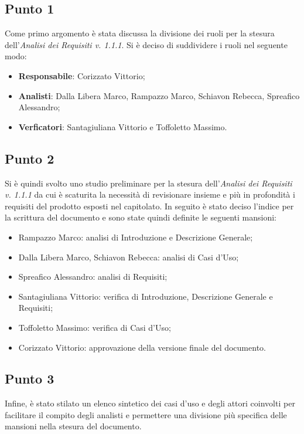     \subsection{Punto 1}
        Come primo argomento è stata discussa la divisione dei ruoli per la stesura dell'\textit{Analisi dei Requisiti v. 1.1.1}. Si è deciso di suddividere i ruoli nel seguente modo:
        \begin{itemize}
            \item \textbf{Responsabile}: Corizzato Vittorio;
            \item \textbf{Analisti}: Dalla Libera Marco, Rampazzo Marco, Schiavon Rebecca, Spreafico Alessandro;
            \item \textbf{Verficatori}: Santagiuliana Vittorio e Toffoletto Massimo. 
        \end{itemize}
    \subsection{Punto 2}
        Si è quindi svolto uno studio preliminare per la stesura dell'\textit{Analisi dei Requisiti v. 1.1.1} da cui è scaturita la necessità di revisionare insieme e più in profondità i requisiti del prodotto esposti nel capitolato. In seguito è stato deciso l'indice per la scrittura del documento e sono state quindi definite le seguenti mansioni:
        \begin{itemize}
        	\item Rampazzo Marco: analisi di Introduzione e Descrizione Generale;
        	\item Dalla Libera Marco, Schiavon Rebecca: analisi di Casi d'Uso;
        	\item Spreafico Alessandro: analisi di Requisiti;
        	\item Santagiuliana Vittorio: verifica di Introduzione, Descrizione Generale e Requisiti;
        	\item Toffoletto Massimo: verifica di Casi d'Uso;
        	\item Corizzato Vittorio: approvazione della versione finale del documento.
        \end{itemize}
    \subsection{Punto 3}
    Infine, è stato stilato un elenco sintetico dei casi d'uso e degli attori coinvolti per facilitare il compito degli analisti e permettere una divisione più specifica delle mansioni nella stesura del documento.